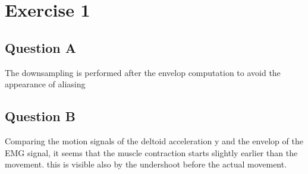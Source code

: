 \documentclass{article}
\begin{document}
	\section*{Exercise 1}
	\subsection*{Question A}
	The downsampling is performed after the envelop computation to avoid the appearance of aliasing
	
	\subsection*{Question B}
	Comparing the motion signals of the deltoid acceleration y and the envelop of the EMG signal, it seems that the muscle contraction starts slightly earlier than the movement. this is visible also by the undershoot before the actual movement.
	
\end{document}
